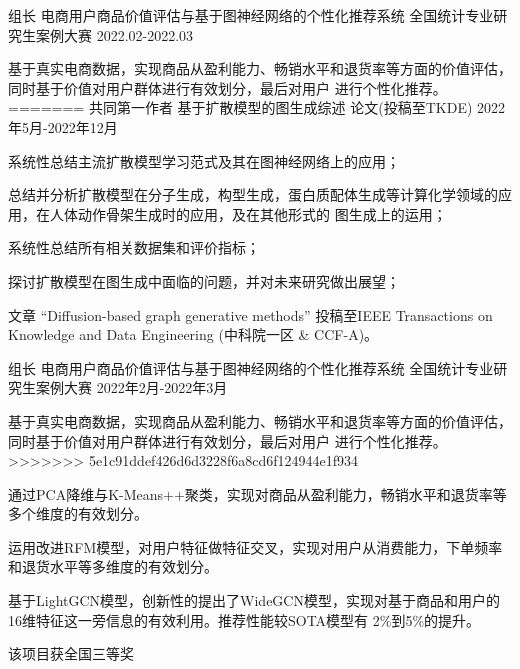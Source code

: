 \begin{cventries}
\cventry
{组长} %
{电商用户商品价值评估与基于图神经网络的个性化推荐系统} %
{全国统计专业研究生案例大赛} %
{2022.02-2022.03} %
{
  \begin{cvitems} %
    \item {基于真实电商数据，实现商品从盈利能力、畅销水平和退货率等方面的价值评估，同时基于价值对用户群体进行有效划分，最后对用户
    进行个性化推荐。}
=======
  {共同第一作者} %
  {基于扩散模型的图生成综述} %
  {论文(投稿至TKDE)} %
  {2022年5月-2022年12月} %
  {
    \begin{cvitems} %
      \item {系统性总结主流扩散模型学习范式及其在图神经网络上的应用；}
      \item {总结并分析扩散模型在分子生成，构型生成，蛋白质配体生成等计算化学领域的应用，在人体动作骨架生成时的应用，及在其他形式的
      图生成上的运用；}
      \item {系统性总结所有相关数据集和评价指标；}
      \item {探讨扩散模型在图生成中面临的问题，并对未来研究做出展望；}
      \item {文章 “Diffusion-based graph generative methods” 投稿至IEEE Transactions on Knowledge and Data Engineering (中科院一区 \& CCF-A)。}
    \end{cvitems}
  }



\cventry
  {组长} %
  {电商用户商品价值评估与基于图神经网络的个性化推荐系统} %
  {全国统计专业研究生案例大赛} %
  {2022年2月-2022年3月} %
  {
    \begin{cvitems} %
      \item {基于真实电商数据，实现商品从盈利能力、畅销水平和退货率等方面的价值评估，同时基于价值对用户群体进行有效划分，最后对用户
      进行个性化推荐。}
>>>>>>> 5e1c91ddef426d6d3228f6a8cd6f124944e1f934
    \item {通过PCA降维与K-Means++聚类，实现对商品从盈利能力，畅销水平和退货率等多个维度的有效划分。}
    \item {运用改进RFM模型，对用户特征做特征交叉，实现对用户从消费能力，下单频率和退货水平等多维度的有效划分。}
    \item {基于LightGCN模型，创新性的提出了WideGCN模型，实现对基于商品和用户的16维特征这一旁信息的有效利用。推荐性能较SOTA模型有
    2\%到5\%的提升。}
    \item {该项目获全国三等奖}
  \end{cvitems}
}


\end{cvitems}}
\end{cventries}
